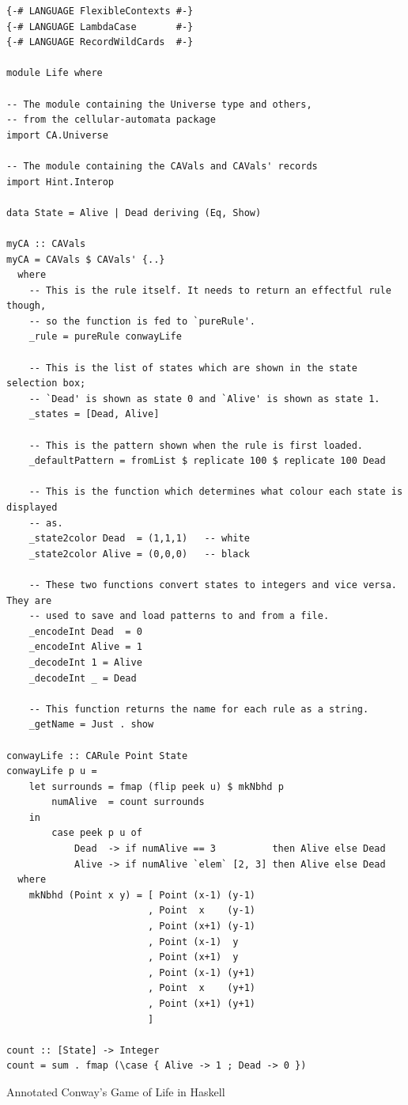 \documentclass[oneside,a4paper]{memoir}
\newenvironment{longlisting}{\captionsetup{type=listing}}{}
\begin{document}

\begin{longlisting}
\begin{verbatim}
{-# LANGUAGE FlexibleContexts #-}
{-# LANGUAGE LambdaCase       #-}
{-# LANGUAGE RecordWildCards  #-}

module Life where

-- The module containing the Universe type and others,
-- from the cellular-automata package
import CA.Universe

-- The module containing the CAVals and CAVals' records
import Hint.Interop

data State = Alive | Dead deriving (Eq, Show)

myCA :: CAVals
myCA = CAVals $ CAVals' {..}
  where
    -- This is the rule itself. It needs to return an effectful rule though,
    -- so the function is fed to `pureRule'.
    _rule = pureRule conwayLife

    -- This is the list of states which are shown in the state selection box;
    -- `Dead' is shown as state 0 and `Alive' is shown as state 1.
    _states = [Dead, Alive]

    -- This is the pattern shown when the rule is first loaded.
    _defaultPattern = fromList $ replicate 100 $ replicate 100 Dead

    -- This is the function which determines what colour each state is displayed
    -- as.
    _state2color Dead  = (1,1,1)   -- white
    _state2color Alive = (0,0,0)   -- black

    -- These two functions convert states to integers and vice versa. They are
    -- used to save and load patterns to and from a file.
    _encodeInt Dead  = 0
    _encodeInt Alive = 1
    _decodeInt 1 = Alive
    _decodeInt _ = Dead

    -- This function returns the name for each rule as a string.
    _getName = Just . show

conwayLife :: CARule Point State
conwayLife p u =
    let surrounds = fmap (flip peek u) $ mkNbhd p
        numAlive  = count surrounds
    in
        case peek p u of
            Dead  -> if numAlive == 3          then Alive else Dead
            Alive -> if numAlive `elem` [2, 3] then Alive else Dead
  where
    mkNbhd (Point x y) = [ Point (x-1) (y-1)
                         , Point  x    (y-1)
                         , Point (x+1) (y-1)
                         , Point (x-1)  y
                         , Point (x+1)  y
                         , Point (x-1) (y+1)
                         , Point  x    (y+1)
                         , Point (x+1) (y+1)
                         ]

count :: [State] -> Integer
count = sum . fmap (\case { Alive -> 1 ; Dead -> 0 })
\end{verbatim}
\caption{Annotated Conway's Game of Life in Haskell}
\label{lst:agol}
\end{longlisting}
\end{document}
